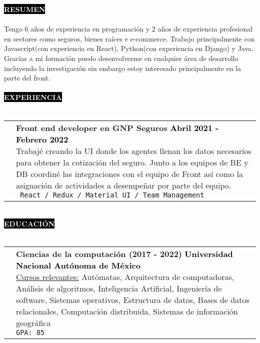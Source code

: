 \documentclass[11pt,A4]{article}
\makeatletter
\newcounter{a}
\newcounter{b}
\newcounter{c}
\newcommand{\cvsection}[1] {
	\textcolor{white}{\MakeUppercase{\textbf{#1}}}
}
\newcommand{\cvsect}[1]{
	\colorbox{black}{{\cvsection{#1}}}\\\\%
}
\newenvironment{entrylist}{%
	\begin{tabular*}{\textwidth}[t]{@{\extracolsep{\fill}}ll}
	}{%
	\end{tabular*}
}
\newcommand{\entry}[5]{%
	&\parbox[t]{17.5cm}{%
		\large\textbf{#1}%
		\hfill
		{\small \textbf{\textcolor{black}{#2}}}\\%
		\normalsize #4\\
		\texttt{#5}
	}\\\\}
\newcommand{\slashsep}{
	\hspace{2mm}/\hspace{2mm}
}
\makeatother
\begin{document}
	\cvsect{Resumen}
	\normalsize Tengo 6 años de experiencia en programación y 2 años de experiencia profesional en sectores como seguros, bienes raíces e e-commerce. Trabajo principalmente con Javascript(con experiencia en React), Python(con experiencia en Django) y Java. Gracias a mi formación puedo desenvolverme en cualquier área de desarrollo incluyendo la investigación sin embargo estoy interesado principalmente en la parte del front. \\
	\\
	\cvsect{Experiencia}
	\begin{entrylist}
		\entry
		{Front end developer en GNP Seguros}
		{Abril 2021 - Febrero 2022}
		{GNP Seguros}
		{Trabajé creando la UI  donde los agentes llenan los datos 		          necesarios para obtener la cotización del seguro. Junto a los equipos de BE y DB coordiné las integraciones con el equipo de Front así como la asignación de actividades a desempeñar por parte del equipo.}
		{ React \slashsep Redux \slashsep Material UI \slashsep Team Management}
		\entry
		{Full stack developer en M22}
		{Octubre 2020 - Febrero 2021}
		{M22}
		{Realicé la UI donde las personas pueden ver en tiempo real los detalles y la disponibilidad de las posibles opciones de compra en distintos tipos de proyectos. Además de la integración con un CMS(Strapi) para la actualización y administración de la información por parte de la empresa.}
		{React \slashsep Strapi \slashsep QGIS \slashsep GraphQL \slashsep PostgreSQL}
		\entry
		{Full stack developer en Ultra maratón sierra mixe}
		{Enero 2020 - Septiembre 2020}
		{Ultra maratón sierra mixe}
		{Realicé la página web de la carrera así como la automatización de los procesos que involucran su realización, tales como la publicidad, el registro y el pago.}
		{React \slashsep Google Firebase \slashsep Bootstrap}
		\entry
		{Full stack developer}
		{Verano 2018}
		{Copnap}
		{Realicé una aplicación para Android donde ayudo a los profesores a calcular la función $\phi$ de Euler, además de poder calcular si un número es primo y los números primos dentro de un rango dado.}
		{Android Studio \slashsep Flutter \slashsep Dart}
	\end{entrylist}
	\\
	\cvsect{Educación}
	\begin{entrylist}
		\entry
		{Ciencias de la computación (\small 2017 - 2022)}
		{Universidad Nacional Autónoma de México }
		{UNAM, Facultad de ciencias}
		{\underline{Cursos relevantes:} Autómatas, Arquitectura de computadoras, Análisis de algoritmos, Inteligencia Artificial, Ingeniería de software, Sistemas operativos, Estructura de datos, Bases de datos relacionales, Computación distribuida, Sistemas de información geográfica} 
		{GPA: 85}
	\end{entrylist}
\end{document}
